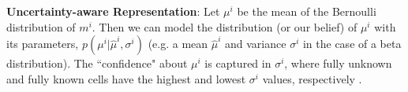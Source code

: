 \documentclass[letterpaper, 10pt, conference]{ieeeconf}      %
\newcommand{\ph}[1]{{\textbf{#1}:}} %
\newcommand{\rev}[1]{{\color{blue}#1}} %
\begin{document}


\ph{Uncertainty-aware Representation}
Let $\mu^i$ be the mean of the Bernoulli distribution of $m^i$.  Then we can model the distribution (or our belief) of $\mu^i$ with its parameters, $p(\mu^i|\hat{\mu}^i,\sigma^{i})$ (e.g. a mean $\hat{\mu}^i$ and variance $\sigma^i$ in the case of a beta distribution). The ``confidence" about $\mu^i$ is captured in $\sigma^i$, where fully unknown and fully known cells have the highest and lowest $\sigma^i$ values, respectively \cite{CRM}. 
\end{document}
